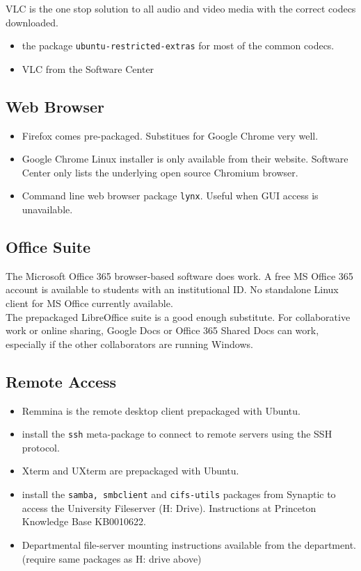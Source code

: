 \documentclass[12pt,letterpaper]{article}
\begin{document}
VLC is the one stop solution to all audio and video media with the correct codecs downloaded.

\begin{itemize}
	\item the package \texttt{ubuntu-restricted-extras} for most of the common codecs.
	\item VLC from the Software Center
\end{itemize}

\subsection{Web Browser}

\begin{itemize}
	\item Firefox comes pre-packaged. Substitues for Google Chrome very well.
	\item Google Chrome Linux installer is only available from their website. Software Center only lists the underlying open source Chromium browser.
	\item Command line web browser package \texttt{lynx}. Useful when GUI access is unavailable.
	
\end{itemize}

\subsection{Office Suite}

The Microsoft Office 365 browser-based software does work. A free MS Office 365 account is available to students with an institutional ID. No standalone Linux client for MS Office currently available. \\

The prepackaged LibreOffice suite is a good enough substitute. For collaborative work or online sharing, Google Docs or Office 365 Shared Docs can work, especially if the other collaborators are running Windows.

\subsection{Remote Access}

\begin{itemize}
	\item Remmina is the remote desktop client prepackaged with Ubuntu.
	\item install the \texttt{ssh} meta-package to connect to remote servers using the SSH protocol.
	\item Xterm and UXterm are prepackaged with Ubuntu.
	\item install the \texttt{samba, smbclient} and \texttt{cifs-utils} packages from Synaptic to access the University Fileserver (H: Drive). Instructions at Princeton Knowledge Base KB0010622.
	\item Departmental file-server mounting instructions available from the department. (require same packages as H: drive above)
	 
\end{itemize}
\end{document}
